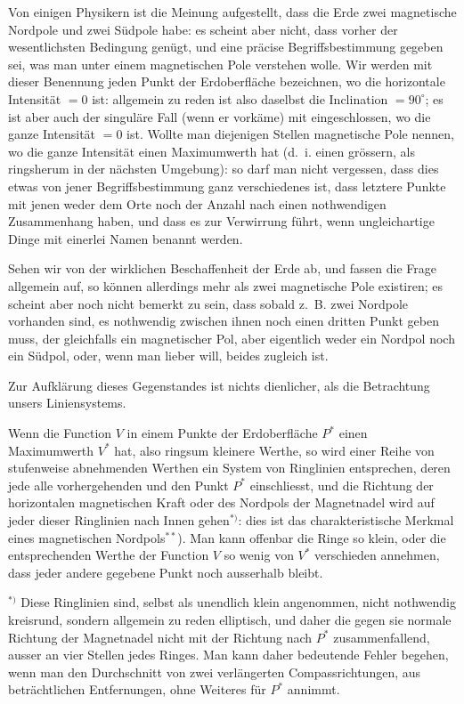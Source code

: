 \documentclass[fontsize=11pt,paper=a4,twoside,openany]{scrbook}
\begin{document}
Von einigen Physikern ist die Meinung aufgestellt, dass die Erde zwei magnetische Nordpole und zwei Südpole habe: es scheint aber nicht, dass vorher der wesentlichsten Bedingung genügt, und eine präcise Begriffsbestimmung gegeben sei, was man unter einem magnetischen Pole verstehen wolle. Wir werden mit dieser Benennung jeden Punkt der Erdoberfläche bezeichnen, wo die horizontale Intensität $=0$ ist: allgemein zu reden ist also daselbst die Inclination $=90^{\circ}$; es ist aber auch der singuläre Fall (wenn er vorkäme) mit eingeschlossen, wo die ganze Intensität $=0$ ist. Wollte man diejenigen Stellen magnetische Pole nennen, wo die ganze Intensität einen Maximumwerth hat (d.~i. einen grössern, als ringsherum in der nächsten Umgebung): so darf man nicht vergessen, dass dies etwas von jener Begriffsbestimmung ganz verschiedenes ist, dass letztere Punkte mit jenen weder dem Orte noch der Anzahl nach einen nothwendigen Zusammenhang haben, und dass es zur Verwirrung führt, wenn ungleichartige Dinge mit einerlei Namen benannt werden.

Sehen wir von der wirklichen Beschaffenheit der Erde ab, und fassen die Frage allgemein auf, so können allerdings mehr als zwei magnetische Pole existiren; es scheint aber noch nicht bemerkt zu sein, dass sobald z.~B. zwei Nordpole vorhanden sind, es nothwendig zwischen ihnen noch einen dritten Punkt geben muss, der gleichfalls ein magnetischer Pol, aber eigentlich weder ein Nordpol noch ein Südpol, oder, wenn man lieber will, beides zugleich ist.

Zur Aufklärung dieses Gegenstandes ist nichts dienlicher, als die Betrachtung unsers Liniensystems.

Wenn die Function $V$ in einem Punkte der Erdoberfläche $P^{*}$ einen Maximumwerth $V^{*}$ hat, also ringsum kleinere Werthe, so wird einer Reihe von stufenweise abnehmenden Werthen ein System von Ringlinien entsprechen, deren jede alle vorhergehenden und den Punkt $P^{*}$ einschliesst, und die Richtung der horizontalen magnetischen Kraft oder des Nordpols der Magnetnadel wird auf jeder dieser Ringlinien nach Innen gehen$^{*)}$: dies ist das charakteristische Merkmal eines magnetischen Nordpols$^{**}$). Man kann offenbar die Ringe so klein, oder die entsprechenden Werthe der Function $V$ so wenig von $V^{*}$ verschieden annehmen, dass jeder andere gegebene Punkt noch ausserhalb bleibt.

$^{*)}$ Diese Ringlinien sind, selbst als unendlich klein angenommen, nicht nothwendig kreisrund, sondern allgemein zu reden elliptisch, und daher die gegen sie normale Richtung der Magnetnadel nicht mit der Richtung nach $P^{*}$ zusammenfallend, ausser an vier Stellen jedes Ringes. Man kann daher bedeutende Fehler begehen, wenn man den Durchschnitt von zwei verlängerten Compassrichtungen, aus beträchtlichen Entfernungen, ohne Weiteres für $P^{*}$ annimmt.
\end{document}
